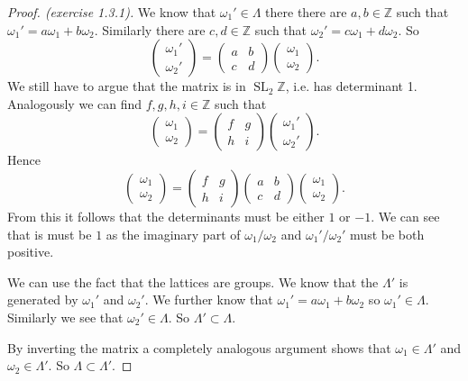 \documentclass[titlepage,a4paper]{article}
\theoremstyle{theoremdd}
\theoremstyle{definitiondd}
\theoremstyle{remarkdd}
\newcommand{\Z}{\mathbb{Z}}
\newcommand{\ltr}{\par \noindent \framebox[1\width]{ $\implies$ } \hspace{.2cm}}
\newcommand{\rtl}{\par \noindent \framebox[1\width]{ $\impliedby$ } \hspace{.2cm} }
\DeclareMathOperator{\SL}{SL}
\begin{document}
\begin{proof}[Proof. (exercise 1.3.1)]
	\ltr
	We know that $\omega_1' \in \Lambda$ there there are $a, b \in \Z$ such that $\omega_1' = a \omega_1 + b \omega_2$. 
	Similarly there are $c, d \in \Z$ such that $\omega_2' = c \omega_1 + d \omega_2$. 
	So  \[
	\begin{pmatrix} \omega_1' \\ \omega_2' \end{pmatrix}  = 
	\begin{pmatrix} a & b \\ c& d \end{pmatrix} 
	\begin{pmatrix} \omega_1 \\ \omega_2 \end{pmatrix} 
	.\] 
	We still have to argue that the matrix is in $\SL_2\Z$, i.e. has determinant 1. 
	Analogously we can find $f, g, h, i \in \Z$ such that \[
	\begin{pmatrix} \omega_1  \\ \omega_2 \end{pmatrix}  = 
	\begin{pmatrix} f & g \\ h& i \end{pmatrix} 
	\begin{pmatrix} \omega_1' \\ \omega_2' \end{pmatrix} 
	.\]
	Hence \[
	\begin{pmatrix} \omega_1 \\ \omega_2 \end{pmatrix}  = 
	\begin{pmatrix} f & g \\ h & i \end{pmatrix} 
	\begin{pmatrix} a & b \\ c & d  \end{pmatrix} 
	\begin{pmatrix} \omega_1 \\ \omega_2 \end{pmatrix} 
	.\]  
	From this it follows that the determinants must be either $1$ or $-1$. 
	We can see that is must be $1$ as the imaginary part of $\omega_1 / \omega_2$ and $\omega_1' / \omega_2'$ must be both positive.
	\rtl
	We can use the fact that the lattices are groups. We know that the $\Lambda'$ is generated by $\omega_1'$ and $\omega_2'$.
	We further know that $\omega_1' = a \omega_1 + b \omega_2$ so $\omega_1' \in \Lambda$. 
	Similarly we see that $\omega_2' \in \Lambda$.
	So $\Lambda' \subset  \Lambda$.

	By inverting the matrix a completely analogous argument shows that $\omega_1 \in \Lambda'$ and $\omega_2 \in \Lambda'$. So $\Lambda \subset \Lambda'$.
\end{proof}
\end{document}
